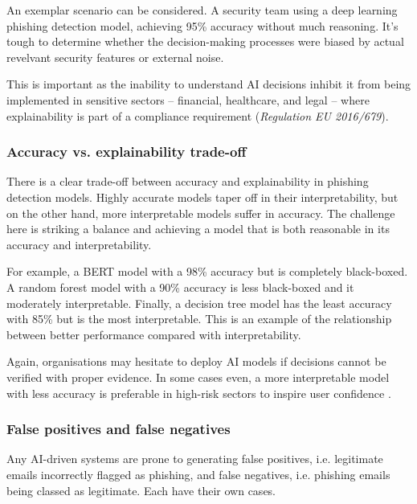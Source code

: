 \noindent An exemplar scenario can be considered. A security team using a deep learning phishing detection model, achieving 95\% accuracy without much reasoning. It's tough to determine whether the decision-making processes were biased by actual revelvant security features or external noise.\newline

\noindent This is important as the inability to understand AI decisions inhibit it from being implemented in sensitive sectors -- financial, healthcare, and legal -- where explainability is part of a compliance requirement (\textit{Regulation EU 2016/679}).

\subsubsection*{Accuracy vs. explainability trade-off}
There is a clear trade-off between accuracy and explainability in phishing detection models. Highly accurate models taper off in their interpretability, but on the other hand, more interpretable models suffer in accuracy. The challenge here is striking a balance and achieving a model that is both reasonable in its accuracy and interpretability.\newline

\noindent For example, a BERT model with a 98\% accuracy but is completely black-boxed. A random forest model with a 90\% accuracy is less black-boxed and it moderately interpretable. Finally, a decision tree model has the least accuracy with 85\% but is the most interpretable. This is an example of the relationship between better performance compared with interpretability.\newline

\noindent Again, organisations may hesitate to deploy AI models if decisions cannot be verified with proper evidence. In some cases even, a more interpretable model with less accuracy is preferable in high-risk sectors to inspire user confidence \citep{guidotti2018survey}.

\subsubsection*{False positives and false negatives}
Any AI-driven systems are prone to generating false positives, i.e. legitimate emails incorrectly flagged as phishing, and false negatives, i.e. phishing emails being classed as legitimate. Each have their own cases.

